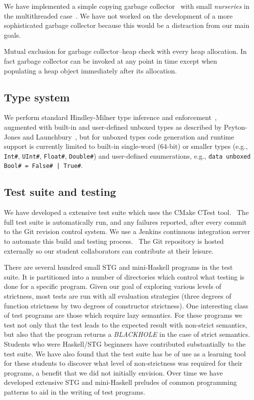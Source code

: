 \documentclass{llncs}
\begin{document}
We have implemented a simple copying garbage collector~\cite{Cheney:1970} with
small \emph{nurseries} in the multithreaded case~\cite{Marlow:2008}. We have
not worked on the development of a more sophisticated garbage collector
because this would be a distraction from our main goals.

Mutual exclusion for garbage collector--heap check with every heap allocation.
In fact garbage collector can be invoked at any point in time except when
populating a heap object immediately after its allocation.



\subsection{Type system}

We perform standard Hindley-Milner type inference and
enforcement~\cite{Heren02}, augmented with built-in and user-defined unboxed
types as described by Peyton-Jones and Launchbury~\cite{Jones91unboxedvalues},
but for unboxed types code generation and runtime support is currently limited
to built-in single-word (64-bit) or smaller types (e.g., \texttt{Int\#},
\texttt{UInt\#}, \texttt{Float\#}, \texttt{Double\#}) and user-defined
enumerations, e.g., \texttt{data unboxed Bool\# = False\# | True\#}.

\subsection{Test suite and testing}

We have developed a extensive test suite which uses the CMake CTest
tool.~\cite{cmake-book} The full test suite is automatically run, and any
failures reported, after every commit to the Git revision control system. We
use a Jenkins continuous integration server to automate this build and testing
process.~\cite{jenkins-book} The Git repository is hosted externally so our
student collaborators can contribute at their leisure.

There are several hundred small STG and mini-Haskell programs in the test suite.
It is partitioned into a number of directories which control what
testing is done for a specific program. Given our goal of exploring various
levels of strictness, most tests are run with all evaluation strategies (three
degrees of function strictness by two degrees of constructor strictness).
One interesting class of test programs are those which require lazy
semantics. For these programs we test not only that the test leads to the expected
result with non-strict semantics, but also that the program returns a
\emph{BLACKHOLE} in the case of strict semantics. Students who were Haskell/STG
beginners have contributed substantially to the test suite. We have also found
that the test suite has be of use as a learning tool for these students to
discover what level of non-strictness was required for their programs,
a benefit that we did not initially envision. Over time we have developed
extensive STG and mini-Haskell preludes of common programming patterns to
aid in the writing of test programs.
\end{document}

